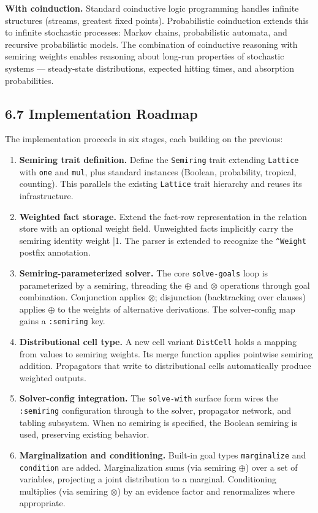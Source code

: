 \documentclass[11pt]{article}
\begin{document}
\textbf{With coinduction.} Standard coinductive logic programming handles infinite structures (streams, greatest fixed points). Probabilistic coinduction extends this to infinite stochastic processes: Markov chains, probabilistic automata, and recursive probabilistic models. The combination of coinductive reasoning with semiring weights enables reasoning about long-run properties of stochastic systems --- steady-state distributions, expected hitting times, and absorption probabilities.
\subsection{6.7 Implementation Roadmap}
\label{sec:org33ce609}

The implementation proceeds in six stages, each building on the previous:

\begin{enumerate}
\item \textbf{Semiring trait definition.} Define the \texttt{Semiring} trait extending \texttt{Lattice} with \texttt{one} and \texttt{mul}, plus standard instances (Boolean, probability, tropical, counting). This parallels the existing \texttt{Lattice} trait hierarchy and reuses its infrastructure.

\item \textbf{Weighted fact storage.} Extend the fact-row representation in the relation store with an optional weight field. Unweighted facts implicitly carry the semiring identity weight \bar{1}. The parser is extended to recognize the \texttt{\textasciicircum{}Weight} postfix annotation.

\item \textbf{Semiring-parameterized solver.} The core \texttt{solve-goals} loop is parameterized by a semiring, threading the \(\oplus\) and \(\otimes\) operations through goal combination. Conjunction applies \(\otimes\); disjunction (backtracking over clauses) applies \(\oplus\) to the weights of alternative derivations. The solver-config map gains a \texttt{:semiring} key.

\item \textbf{Distributional cell type.} A new cell variant \texttt{DistCell} holds a mapping from values to semiring weights. Its merge function applies pointwise semiring addition. Propagators that write to distributional cells automatically produce weighted outputs.

\item \textbf{Solver-config integration.} The \texttt{solve-with} surface form wires the \texttt{:semiring} configuration through to the solver, propagator network, and tabling subsystem. When no semiring is specified, the Boolean semiring is used, preserving existing behavior.

\item \textbf{Marginalization and conditioning.} Built-in goal types \texttt{marginalize} and \texttt{condition} are added. Marginalization sums (via semiring \(\oplus\)) over a set of variables, projecting a joint distribution to a marginal. Conditioning multiplies (via semiring \(\otimes\)) by an evidence factor and renormalizes where appropriate.
\end{enumerate}
\end{document}
